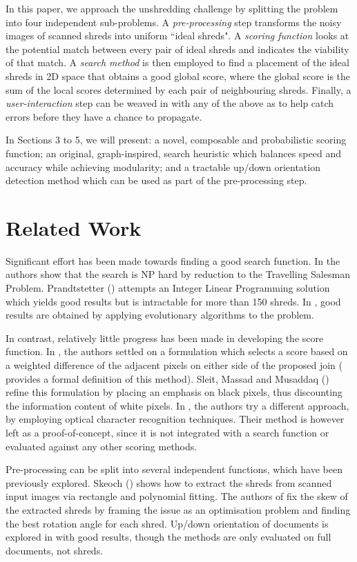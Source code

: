 \documentclass{llncs}
\begin{document}
In this paper, we approach the unshredding challenge by splitting the problem into four independent sub-problems. A \emph{pre-processing} step transforms the noisy images of scanned shreds into uniform ``ideal shreds". A \emph{scoring function} looks at the potential match between every pair of ideal shreds and indicates the viability of that match. A \emph{search method} is then employed to find a placement of the ideal shreds in 2D space that obtains a good global score, where the global score is the sum of the local scores determined by each pair of neighbouring shreds. Finally, a \emph{user-interaction} step can be weaved in with any of the above as to help catch errors before they have a chance to propagate.

 In Sections 3 to 5, we will present: a novel, composable and probabilistic scoring function; an original, graph-inspired, search heuristic which balances speed and accuracy while achieving modularity; and a tractable up/down orientation detection method which can be used as part of the pre-processing step.

\section{Related Work}
Significant effort has been made towards finding a good search function. In \cite{P1} the authors show that the search is NP hard by reduction to the Travelling Salesman Problem. Prandtstetter (\cite{P2}) attempts an Integer Linear Programming solution which yields good results but is intractable for more than 150 shreds. In \cite{P3,P4}, good results are obtained by applying evolutionary algorithms to the problem. 

In contrast, relatively little progress has been made in developing the score function. In \cite{P7,P2,P1,P3,P4}, the authors settled on a formulation which selects a score based on a weighted difference of the adjacent pixels on either side of the proposed join (\cite{P7} provides a formal definition of this method). Sleit, Massad and Musaddaq (\cite{P5}) refine this formulation by placing an emphasis on black pixels, thus discounting the information content of white pixels. In \cite{P8}, the authors try a different approach, by employing optical character recognition techniques. Their method is however left as a proof-of-concept, since it is not integrated with a search function or evaluated against any other scoring methods.

Pre-processing can be split into several independent functions, which have been previously explored. Skeoch (\cite{P9}) shows how to extract the shreds from scanned input images via rectangle and polynomial fitting. The authors of \cite{P10} fix the skew of the extracted shreds by framing the issue as an optimisation problem and finding the best rotation angle for each shred. Up/down orientation of documents is explored in \cite{P12,P11} with good results, though the methods are only evaluated on full documents, not shreds.
\end{document}
